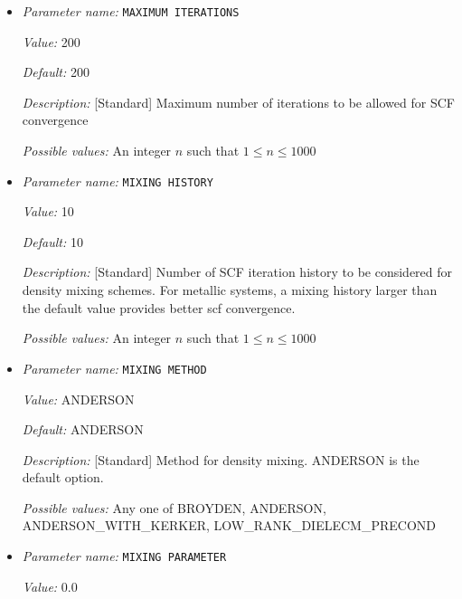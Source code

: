 \begin{itemize}
{\it Possible values:} A floating point number $v$ such that $0 \leq v \leq 1000$
\item {\it Parameter name:} {\tt MAXIMUM ITERATIONS}
\label{parameters:SCF parameters/MAXIMUM ITERATIONS}
\label{parameters:SCF_20parameters/MAXIMUM_20ITERATIONS}


{\it Value:} 200


{\it Default:} 200


{\it Description:} [Standard] Maximum number of iterations to be allowed for SCF convergence


{\it Possible values:} An integer $n$ such that $1\leq n \leq 1000$
\item {\it Parameter name:} {\tt MIXING HISTORY}
\label{parameters:SCF parameters/MIXING HISTORY}
\label{parameters:SCF_20parameters/MIXING_20HISTORY}


{\it Value:} 10


{\it Default:} 10


{\it Description:} [Standard] Number of SCF iteration history to be considered for density mixing schemes. For metallic systems, a mixing history larger than the default value provides better scf convergence.


{\it Possible values:} An integer $n$ such that $1\leq n \leq 1000$
\item {\it Parameter name:} {\tt MIXING METHOD}
\label{parameters:SCF parameters/MIXING METHOD}
\label{parameters:SCF_20parameters/MIXING_20METHOD}


{\it Value:} ANDERSON


{\it Default:} ANDERSON


{\it Description:} [Standard] Method for density mixing. ANDERSON is the default option.


{\it Possible values:} Any one of BROYDEN, ANDERSON, ANDERSON\_WITH\_KERKER, LOW\_RANK\_DIELECM\_PRECOND
\item {\it Parameter name:} {\tt MIXING PARAMETER}
\label{parameters:SCF parameters/MIXING PARAMETER}
\label{parameters:SCF_20parameters/MIXING_20PARAMETER}


{\it Value:} 0.0



\end{itemize}
